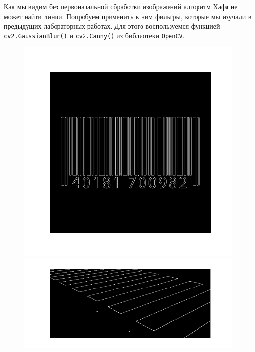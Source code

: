 \documentclass[a4paper,12pt]{article}
\begin{document}
\noindent Как мы видим без первоначальной обработки изображений алгоритм Хафа не может найти линии. Попробуем применить к ним фильтры, которые мы изучали в предыдущих лабораторных работах. Для этого воспользуемся функцией \texttt{cv2.GaussianBlur()} и \texttt{cv2.Canny()} из библиотеки \texttt{OpenCV}.

\begin{figure}[H]
    \centering
    \begin{minipage}{0.48\textwidth}
        \centering
        \includegraphics[width=\textwidth]{images/hough_lines/1_proc_canny.png}
    \end{minipage}
    \begin{minipage}{0.48\textwidth}
        \centering
        \includegraphics[width=\textwidth]{images/hough_lines/2_proc_canny.png}

\end{minipage}
\end{figure}
\end{document}
